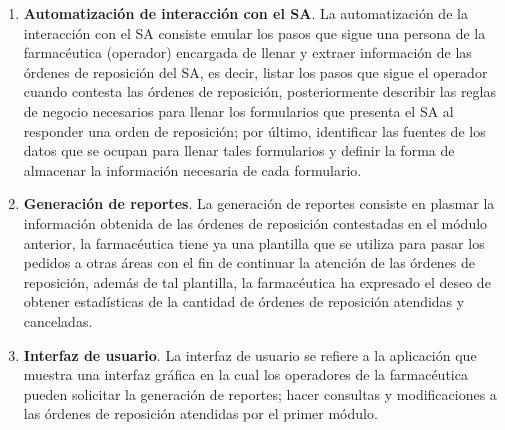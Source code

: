 \documentclass[letterpaper,11pt]{article}
\begin{document}
\begin{enumerate}
\item \textbf{Automatización de interacción con el SA}. La automatización de la interacción con el SA consiste emular los pasos que sigue una persona de la farmacéutica (operador) encargada de llenar y extraer información de las órdenes de reposición del SA, es decir, listar los pasos que sigue el operador cuando contesta las órdenes de reposición, posteriormente describir las reglas de negocio necesarios para llenar los formularios que presenta el SA al responder una orden de reposición; por último, identificar las fuentes de los datos que se ocupan para llenar tales formularios y definir la forma de almacenar la información necesaria de cada formulario.
\item \textbf{Generación de reportes}. La generación de reportes consiste en plasmar la información obtenida de las órdenes de reposición contestadas en el módulo anterior, la farmacéutica tiene ya una plantilla que se utiliza para pasar los pedidos a otras áreas con el fin de continuar la atención de las órdenes de reposición, además de tal plantilla, la farmacéutica ha expresado el deseo de obtener estadísticas de la cantidad de órdenes de reposición atendidas y canceladas.
\item \textbf{Interfaz de usuario}. La interfaz de usuario se refiere a la aplicación que muestra una interfaz gráfica en la cual los operadores de la farmacéutica pueden solicitar la generación de reportes; hacer consultas y modificaciones a las órdenes de reposición atendidas por el primer módulo.
\end{enumerate}
\end{document}
